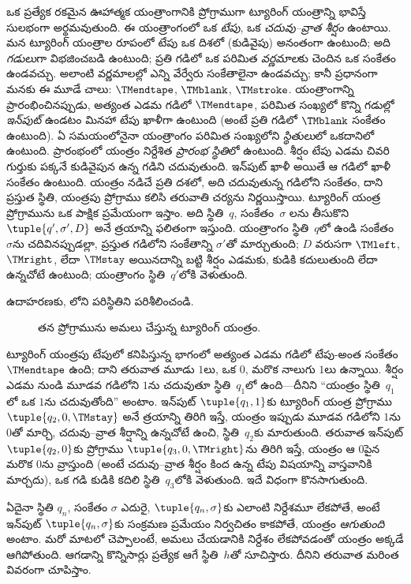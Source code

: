\documentclass[../../../include/open-logic-section]{subfiles}
\begin{document}
\begin{explain}
ఒక ప్రత్యేక రకమైన ఊహాత్మక యంత్రాంగానికి ప్రోగ్రాముగా ట్యూరింగ్ యంత్రాన్ని
భావిస్తే సులభంగా అర్థమవుతుంది. ఈ యంత్రాంగంలో ఒక \emph{టేపు}, ఒక
\emph{చదువు--వ్రాత శీర్షం} ఉంటాయి. మన ట్యూరింగ్ యంత్రాల రూపంలో టేపు ఒక
దిశలో (కుడివైపు) అనంతంగా ఉంటుంది; అది \emph{గడులు}గా విభజించబడి ఉంటుంది;
ప్రతి గడిలో ఒక పరిమిత \emph{వర్ణమాల}కు చెందిన ఒక సంకేతం ఉండవచ్చు. అలాంటి
వర్ణమాలల్లో ఎన్ని వేర్వేరు సంకేతాలైనా ఉండవచ్చు; కానీ ప్రధానంగా మనకు ఈ మూడే
చాలు: $\TMendtape$, $\TMblank$, $\TMstroke$. యంత్రాంగాన్ని ప్రారంభించినప్పుడు,
అత్యంత ఎడమ గడిలో $\TMendtape$, పరిమిత సంఖ్యలో కొన్ని గడుల్లో
\emph{ఇన్‌పుట్} ఉండటం మినహా టేపు ఖాళీగా ఉంటుంది (అంటే ప్రతి గడిలో
$\TMblank$ సంకేతం ఉంటుంది). ఏ సమయంలోనైనా యంత్రాంగం పరిమిత సంఖ్యలోని
\emph{స్థితులు}లో ఒకదానిలో ఉంటుంది. ప్రారంభంలో యంత్రం నిర్దేశిత \emph{ప్రారంభ స్థితి}లో ఉంటుంది. శీర్షం
టేపు ఎడమ చివరి గుర్తుకు పక్కనే కుడివైపున ఉన్న గడిని చదువుతుంది.
ఇన్‌పుట్ ఖాళీ అయితే ఆ గడిలో ఖాళీ సంకేతం ఉంటుంది. యంత్రం నడిచే ప్రతి
దశలో, అది చదువుతున్న గడిలోని సంకేతం, దాని ప్రస్తుత స్థితి, యంత్రపు
ప్రోగ్రాము కలిసి తరువాతి చర్యను నిర్ణయిస్తాయి. ట్యూరింగ్
యంత్ర ప్రోగ్రామును ఒక పాక్షిక ప్రమేయంగా ఇస్తాం. అది స్థితి~$q$, సంకేతం~$\sigma$
లను తీసుకొని $\tuple{q', \sigma', D}$ అనే త్రయాన్ని ఫలితంగా
ఇస్తుంది. యంత్రాంగం స్థితి~$q$లో ఉండి సంకేతం~$\sigma$ను చదివినప్పుడల్లా,
ప్రస్తుత గడిలోని సంకేతాన్ని $\sigma'$తో మార్చుతుంది; $D$ వరుసగా $\TMleft$,
$\TMright$, లేదా $\TMstay$ అయినదాన్ని బట్టి శీర్షం ఎడమకు, కుడికి కదులుతుంది
లేదా ఉన్నచోటే ఉంటుంది; యంత్రాంగం స్థితి~$q'$లోకి వెళుతుంది.

ఉదాహరణకు, లోని పరిస్థితిని పరిశీలించండి.
\begin{figure}
  \caption{తన ప్రోగ్రామును అమలు చేస్తున్న ట్యూరింగ్ యంత్రం.}
\end{figure}
ట్యూరింగ్ యంత్రపు టేపులో కనిపిస్తున్న భాగంలో అత్యంత ఎడమ గడిలో
టేపు-అంత సంకేతం $\TMendtape$ ఉంది; దాని తరువాత మూడు $1$లు, ఒక $0$, మరొక
నాలుగు $1$లు ఉన్నాయి. శీర్షం ఎడమ నుండి మూడవ గడిలోని $1$ను చదువుతూ
స్థితి~$q_1$లో ఉంది---దీనిని ``యంత్రం స్థితి~$q_1$లో ఒక $1$ను చదువుతోంది''
అంటాం. ఇన్‌పుట్ $\tuple{q_1, 1}$కు ట్యూరింగ్ యంత్ర ప్రోగ్రాము
$\tuple{q_2, 0, \TMstay}$ అనే త్రయాన్ని తిరిగి ఇస్తే, యంత్రం ఇప్పుడు మూడవ
గడిలోని $1$ను $0$తో మార్చి, చదువు--వ్రాత శీర్షాన్ని ఉన్నచోటే ఉంచి,
స్థితి~$q_2$కు మారుతుంది. తరువాత ఇన్‌పుట్ $\tuple{q_2, 0}$కు ప్రోగ్రాము
$\tuple{q_3, 0, \TMright}$ను తిరిగి ఇస్తే, యంత్రం ఆ $0$పైన మరొక $0$ను
వ్రాస్తుంది (అంటే చదువు--వ్రాత శీర్షం కింద ఉన్న టేపు విషయాన్ని వాస్తవానికి
మార్చదు), ఒక గడి కుడికి కదిలి స్థితి~$q_3$లోకి వెళుతుంది. ఇదే విధంగా
కొనసాగుతుంది.

ఏదైనా స్థితి $q_n$, సంకేతం $\sigma$ ఎదురై, $\tuple{q_n, \sigma}$కు ఎలాంటి
నిర్దేశమూ లేకపోతే, అంటే ఇన్‌పుట్ $\tuple{q_n,\sigma}$కు సంక్రమణ ప్రమేయం
నిర్వచితం కాకపోతే, యంత్రం \emph{ఆగుతుంది} అంటాం. మరో మాటలో చెప్పాలంటే,
అమలు చేయడానికి నిర్దేశం లేకపోవడంతో యంత్రం అక్కడే ఆగిపోతుంది.
ఆగడాన్ని కొన్నిసార్లు ప్రత్యేక ఆగే స్థితి~$h$తో సూచిస్తారు. దీనిని తరువాత
మరింత వివరంగా చూపిస్తాం.
\end{explain}
\end{document}
